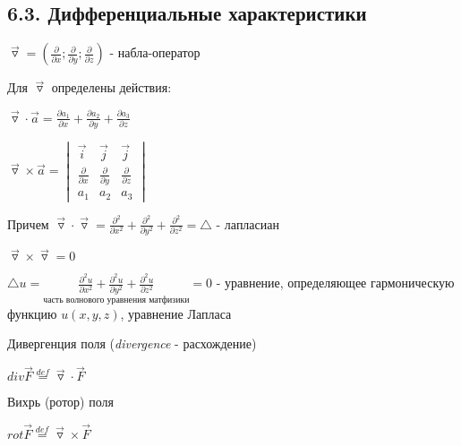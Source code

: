 \documentclass[12pt]{article}
\begin{document}
    \subsection{6.3. Дифференциальные характеристики}

    $\overrightarrow{\triangledown} = \left(\frac{\partial}{\partial x}; \frac{\partial}{\partial y}; \frac{\partial}{\partial z}\right)$ - набла-оператор

    \Nota Для $\overrightarrow{\triangledown}$ определены действия:

    $\overrightarrow{\triangledown} \cdot \overrightarrow{a} = \frac{\partial a_1}{\partial x} + \frac{\partial a_2}{\partial y} + \frac{\partial a_3}{\partial z}$

    $\overrightarrow{\triangledown} \times \overrightarrow{a} =
    \begin{vmatrix}
        \overrightarrow{i}          & \overrightarrow{j}          & \overrightarrow{j}          \\
        \frac{\partial}{\partial x} & \frac{\partial}{\partial y} & \frac{\partial}{\partial z} \\
        a_1                         & a_2                         & a_3
    \end{vmatrix}$

    Причем $\overrightarrow{\triangledown} \cdot \overrightarrow{\triangledown} = \frac{\partial^2}{\partial x^2} + \frac{\partial^2}{\partial y^2} + \frac{\partial^2}{\partial z^2} = \triangle$ - лапласиан

    $\overrightarrow{\triangledown} \times \overrightarrow{\triangledown} = 0$

    \Nota $\triangle u = \underset{\text{часть волнового уравнения матфизики}}{\frac{\partial^2 u}{\partial x^2} + \frac{\partial^2 u}{\partial y^2} + \frac{\partial^2 u}{\partial z^2}} = 0$ - уравнение, определяющее гармоническую функцию $u(x, y, z)$, уравнение Лапласа

    \hypertarget{divergence}{}

     Дивергенция поля (\textit{divergence} - расхождение)

    $div \overrightarrow{F} \stackrel{def}{=} \overrightarrow{\triangledown} \cdot \overrightarrow{F}$

    \hypertarget{rotor}{}

     Вихрь (ротор) поля

    $rot \overrightarrow{F} \stackrel{def}{=} \overrightarrow{\triangledown} \times \overrightarrow{F}$
\end{document}
